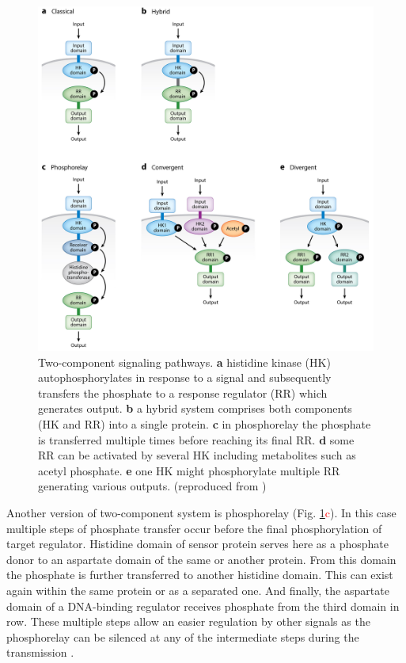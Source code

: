 \begin{figure}[h!]
  \centering
  \includegraphics[scale=0.85]{text/Pictures/TwoComponent.jpeg}
	\caption{Two-component signaling pathways. \textbf{a} histidine kinase (HK) autophosphorylates in response to a signal and subsequently transfers the phosphate to a response regulator (RR) which generates output. \textbf{b} a hybrid system comprises both components (HK and RR) into a single protein. \textbf{c} in phosphorelay the phosphate is transferred multiple times before reaching its final RR. \textbf{d} some RR can be activated by several HK including metabolites such as acetyl phosphate. \textbf{e} one HK might phosphorylate multiple RR generating various outputs. (reproduced from \cite{groisman2016feedback})}
	\label{two}
\end{figure}

Another version of two-component system is phosphorelay (Fig. \ref{two}\textcolor{red}{c}).
In this case multiple steps of phosphate transfer occur before the final phosphorylation of target regulator.
Histidine domain of sensor protein serves here as a phosphate donor to an aspartate domain of the same or another protein.
From this domain the phosphate is further transferred to another histidine domain.
This can exist again within the same protein or as a separated one.
And finally, the aspartate domain of a DNA-binding regulator receives phosphate from the third domain in row.
These multiple steps allow an easier regulation by other signals as the phosphorelay can be silenced at any of the intermediate steps during the transmission \cite{perego2001pentapeptide, groisman2016feedback}.

